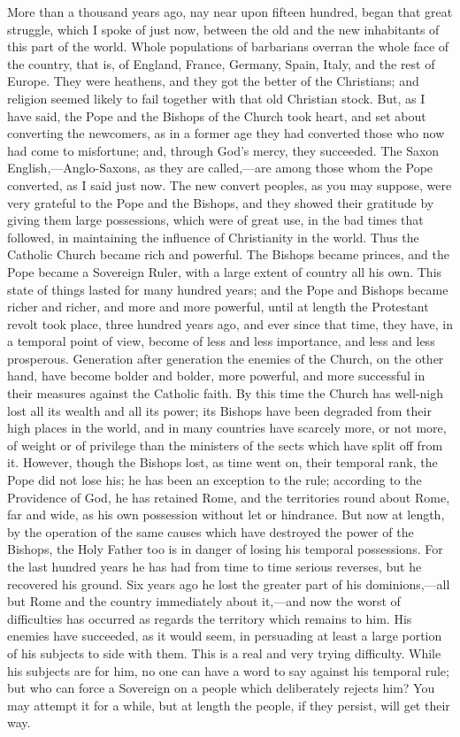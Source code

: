 More than a thousand years ago, nay near upon fifteen
hundred, began that great struggle, which I spoke of just
now, between the old and the new inhabitants of this part
of the world. Whole populations of barbarians overran the
whole face of the country, that is, of England, France,
Germany, Spain, Italy, and the rest of Europe. They were
heathens, and they got the better of the Christians; and
religion seemed likely to fail together with that old
Christian stock. But, as I have said, the Pope and the
Bishops of the Church took heart, and set about
converting the newcomers, as in a former age they had
converted those who now had come to misfortune; and, through God's mercy, they succeeded. The Saxon
English,—Anglo-Saxons, as they are called,—are
among those whom the Pope converted, as I said just now.
The new convert peoples, as you may suppose, were very
grateful to the Pope and the Bishops, and they showed
their gratitude by giving them large possessions, which
were of great use, in the bad times that followed, in
maintaining the influence of Christianity in the world.
Thus the Catholic Church became rich and powerful. The
Bishops became princes, and the Pope became a Sovereign
Ruler, with a large extent of country all his own. This
state of things lasted for many hundred years; and the
Pope and Bishops became richer and richer, and more and
more powerful, until at length the Protestant revolt took
place, three hundred years ago, and ever since that time,
they have, in a temporal point of view, become of less
and less importance, and less and less prosperous.
Generation after generation the enemies of the Church, on
the other hand, have become bolder and bolder, more
powerful, and more successful in their measures against
the Catholic faith. By this time the Church has well-nigh
lost all its wealth and all its power; its Bishops have
been degraded from their high places in the world, and in
many countries have scarcely more, or not more, of weight
or of privilege than the ministers of the sects which
have split off from it. However, though the Bishops lost,
as time went on, their temporal rank, the Pope did not
lose his; he has been an exception to the rule; according
to the Providence of God, he has retained Rome, and the
territories round about Rome, far and wide, as his own
possession without let or hindrance. But now at length, by the operation of the same causes
which have destroyed the power of the Bishops, the Holy
Father too is in danger of losing his temporal
possessions. For the last hundred years he has had from
time to time serious reverses, but he recovered his
ground. Six years ago he lost the greater part of his
dominions,—all but Rome and the country immediately
about it,—and now the worst of difficulties has
occurred as regards the territory which remains to him.
His enemies have succeeded, as it would seem, in
persuading at least a large portion of his subjects to
side with them. This is a real and very trying
difficulty. While his subjects are for him, no one can
have a word to say against his temporal rule; but who can
force a Sovereign on a people which deliberately rejects
him? You may attempt it for a while, but at length the
people, if they persist, will get their way.

